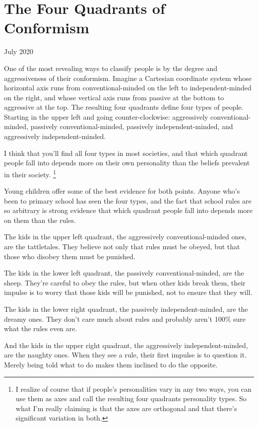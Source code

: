 \chapter{The Four Quadrants of Conformism}

July 2020

One of the most revealing ways to classify people is by the degree and
aggressiveness of their conformism. Imagine a Cartesian coordinate
system whose horizontal axis runs from conventional-minded on the left
to independent-minded on the right, and whose vertical axis runs from
passive at the bottom to aggressive at the top. The resulting four
quadrants define four types of people. Starting in the upper left and
going counter-clockwise: aggressively conventional-minded, passively
conventional-minded, passively independent-minded, and aggressively
independent-minded.

I think that you'll find all four types in most societies, and that
which quadrant people fall into depends more on their own personality
than the beliefs prevalent in their society. \footnote{I realize of course that if people's personalities vary in any
two ways, you can use them as axes and call the resulting four quadrants
personality types. So what I'm really claiming is that the axes are
orthogonal and that there's significant variation in both.}

Young children offer some of the best evidence for both points. Anyone
who's been to primary school has seen the four types, and the fact that
school rules are so arbitrary is strong evidence that which quadrant
people fall into depends more on them than the rules.

The kids in the upper left quadrant, the aggressively
conventional-minded ones, are the tattletales. They believe not only
that rules must be obeyed, but that those who disobey them must be
punished.

The kids in the lower left quadrant, the passively conventional-minded,
are the sheep. They're careful to obey the rules, but when other kids
break them, their impulse is to worry that those kids will be punished,
not to ensure that they will.

The kids in the lower right quadrant, the passively independent-minded,
are the dreamy ones. They don't care much about rules and probably
aren't 100\% sure what the rules even are.

And the kids in the upper right quadrant, the aggressively
independent-minded, are the naughty ones. When they see a rule, their
first impulse is to question it. Merely being told what to do makes them
inclined to do the opposite.

